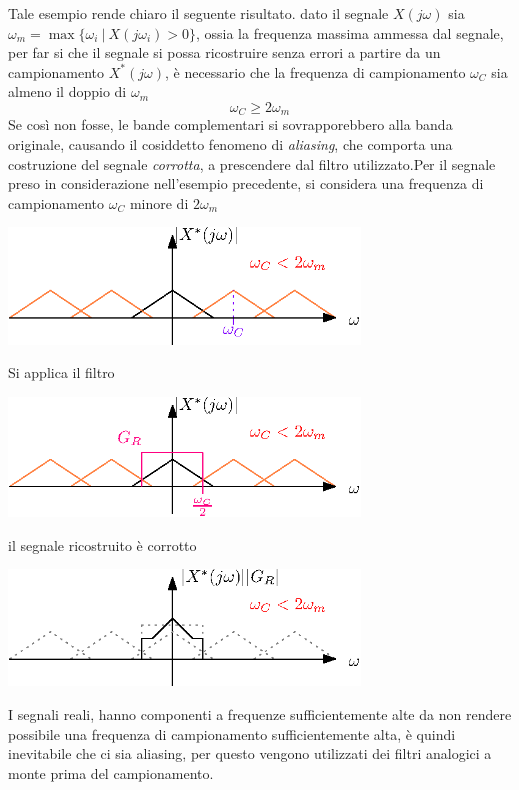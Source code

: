 \documentclass[10pt, letterpaper]{report}
\begin{document}
Tale esempio rende chiaro il seguente risultato.\acc 
{} dato il segnale $X(j\omega)$ sia $\omega_m=\max\{\omega_i\ | \ X(j\omega_i)>0\}$, ossia la frequenza massima ammessa dal segnale, per far si che il segnale si possa ricostruire senza errori a partire da un campionamento $X^*(j\omega)$, è necessario che la frequenza di campionamento $\omega_C$ sia almeno il doppio di $\omega_m$ $$\omega_C\ge 2\omega_m $$
Se così non fosse, le bande complementari si sovrapporebbero alla banda originale, causando il cosiddetto fenomeno di \textit{aliasing}, che comporta una costruzione del segnale \textit{corrotta}, a prescendere dal filtro utilizzato.\acc Per il segnale preso in considerazione nell'esempio precedente, si considera una frequenza di campionamento $\omega_C$ minore di $2\omega_m$
\begin{center}
    \includegraphics[width=0.7\textwidth]{images/segLimitatoBanda4.eps}
\end{center}
Si applica il filtro 
\begin{center}
    \includegraphics[width=0.7\textwidth]{images/segLimitatoBanda5.eps}
\end{center}
il segnale ricostruito è corrotto
\begin{center}
    \includegraphics[width=0.7\textwidth]{images/segLimitatoBanda6.eps}
\end{center}
I segnali reali, hanno componenti a frequenze sufficientemente alte da non rendere possibile una frequenza di campionamento sufficientemente alta, è quindi inevitabile che ci sia aliasing, per questo vengono utilizzati dei filtri analogici a monte prima del campionamento. 
\end{document}
